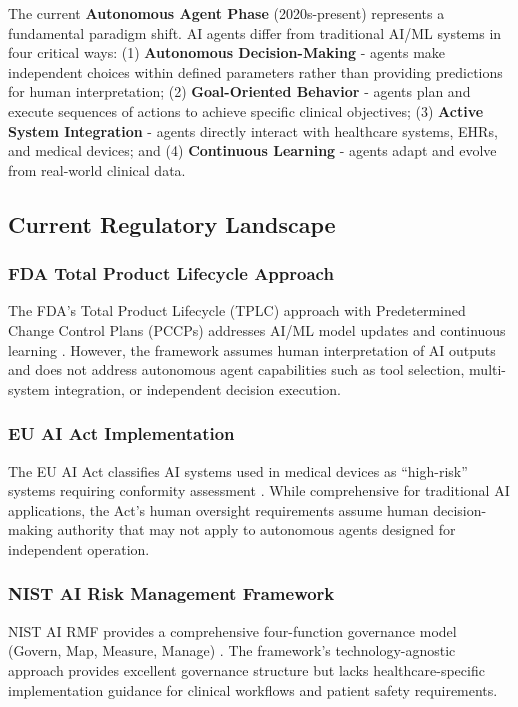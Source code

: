 \documentclass[11pt]{article}
\begin{document}
The current \textbf{Autonomous Agent Phase} (2020s-present) represents a fundamental paradigm shift. AI agents differ from traditional AI/ML systems in four critical ways: (1) \textbf{Autonomous Decision-Making} - agents make independent choices within defined parameters rather than providing predictions for human interpretation; (2) \textbf{Goal-Oriented Behavior} - agents plan and execute sequences of actions to achieve specific clinical objectives; (3) \textbf{Active System Integration} - agents directly interact with healthcare systems, EHRs, and medical devices; and (4) \textbf{Continuous Learning} - agents adapt and evolve from real-world clinical data.

\subsection{Current Regulatory Landscape}

\subsubsection{FDA Total Product Lifecycle Approach}

The FDA's Total Product Lifecycle (TPLC) approach with Predetermined Change Control Plans (PCCPs) addresses AI/ML model updates and continuous learning \cite{fda2021aiml}. However, the framework assumes human interpretation of AI outputs and does not address autonomous agent capabilities such as tool selection, multi-system integration, or independent decision execution.

\subsubsection{EU AI Act Implementation}

The EU AI Act classifies AI systems used in medical devices as ``high-risk'' systems requiring conformity assessment \cite{eu2024aiact}. While comprehensive for traditional AI applications, the Act's human oversight requirements assume human decision-making authority that may not apply to autonomous agents designed for independent operation.

\subsubsection{NIST AI Risk Management Framework}

NIST AI RMF provides a comprehensive four-function governance model (Govern, Map, Measure, Manage) \cite{nist2023airisk}. The framework's technology-agnostic approach provides excellent governance structure but lacks healthcare-specific implementation guidance for clinical workflows and patient safety requirements.
\end{document}
